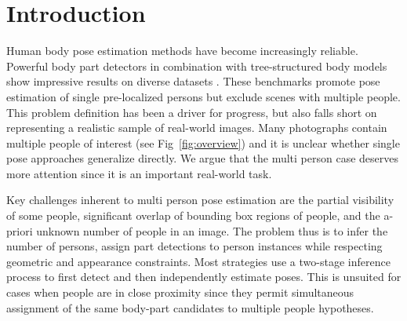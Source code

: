 \section{Introduction}
%
Human body pose estimation methods have become
increasingly reliable.
Powerful body part
detectors \cite{Tompson:2015:EOL} in combination with
tree-structured body models \cite{tompson14nips,chen14nips} show
impressive results on diverse datasets
\cite{johnson11cvpr,andriluka14cvpr,sapp13cvpr}.
  These benchmarks promote pose estimation of
  single pre-localized persons but exclude
  scenes with multiple people.
%
  This problem definition has been a driver for %
  progress, but also falls short on representing a
  realistic sample of real-world images. Many photographs contain multiple
  people of interest (see Fig~\ref{fig:overview})
  and it is unclear whether single pose
  approaches generalize directly. We argue that
  the multi person case deserves more attention since it is an important real-world task.


  Key challenges inherent to multi person pose estimation are the partial visibility
  of some people,
  significant overlap of bounding box regions of people,
%
  and the a-priori unknown number of people in an image.
  The problem thus is to infer the number of persons, assign part detections
  to person instances while respecting geometric and
  appearance constraints.
  Most strategies use a two-stage inference process
  \cite{pishchulin12cvpr,Gkioxari:2014:UKP,Sun:2011:APM} to first
  detect and then independently estimate poses. This is
  unsuited for cases when people are in close proximity since they
  permit simultaneous assignment of the same body-part candidates to
  multiple people hypotheses.

